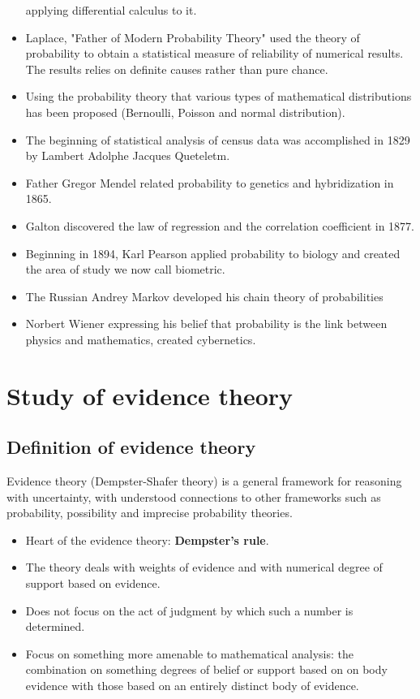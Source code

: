 \documentclass[11pt]{article}
\begin{document}
\begin{itemize}
applying differential calculus to it.
\item Laplace, "Father of Modern Probability Theory" used the theory of probability
to obtain a statistical measure of reliability of numerical results. The
results relies on definite causes rather than pure chance.
\item Using the probability theory that various types of mathematical distributions
has been proposed (Bernoulli, Poisson and normal distribution).
\item The beginning of statistical analysis of census data was accomplished in 1829
by Lambert Adolphe Jacques Queteletm.
\item Father Gregor Mendel related probability to genetics and hybridization
in 1865.
\item Galton discovered the law of regression and the correlation coefficient
in 1877.
\item Beginning in 1894, Karl Pearson applied probability to biology and created the
area of study we now call biometric.
\item The Russian Andrey Markov developed his chain theory of probabilities
\item Norbert Wiener expressing his belief that probability is the link between
physics and mathematics, created cybernetics.
\end{itemize}


\section{Study of evidence theory}
\label{sec:orgbf8120a}

\subsection{Definition of evidence theory}
\label{sec:org8d0a8e9}

Evidence theory (Dempster-Shafer theory) is a general framework for reasoning
with uncertainty, with understood connections to other frameworks such as
probability, possibility and imprecise probability theories.

\begin{itemize}
\item Heart of the evidence theory: \textbf{Dempster's rule}.
\item The theory deals with weights of evidence and with numerical degree of support
based on evidence.
\item Does not focus on the act of judgment by which such a number is determined.
\item Focus on something more amenable to mathematical analysis: the combination on
something degrees of belief or support based on on body evidence with those
based on an entirely distinct body of evidence.
\end{itemize}
\end{document}
